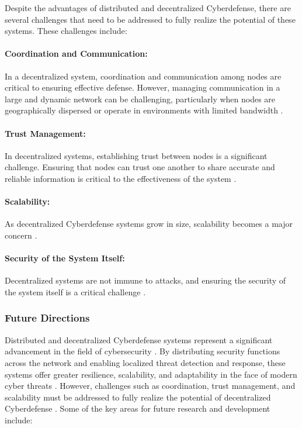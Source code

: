 Despite the advantages of distributed and decentralized Cyberdefense, there are several challenges that need to be addressed to fully realize the potential of these systems. These challenges include:

\paragraph{Coordination and Communication:}
In a decentralized system, coordination and communication among nodes are critical to ensuring effective defense. However, managing communication in a large and dynamic network can be challenging, particularly when nodes are geographically dispersed or operate in environments with limited bandwidth \cite{Xu2017}.

\paragraph{Trust Management:}
In decentralized systems, establishing trust between nodes is a significant challenge. Ensuring that nodes can trust one another to share accurate and reliable information is critical to the effectiveness of the system \cite{Yan2014}.

\paragraph{Scalability:}
As decentralized Cyberdefense systems grow in size, scalability becomes a major concern \cite{Bera2017}.

\paragraph{Security of the System Itself:}
Decentralized systems are not immune to attacks, and ensuring the security of the system itself is a critical challenge \cite{Roman2013}.

\subsubsection{Future Directions}

Distributed and decentralized Cyberdefense systems represent a significant advancement in the field of cybersecurity \cite{Christidis2016}. By distributing security functions across the network and enabling localized threat detection and response, these systems offer greater resilience, scalability, and adaptability in the face of modern cyber threats \cite{Roman2013}. However, challenges such as coordination, trust management, and scalability must be addressed to fully realize the potential of decentralized Cyberdefense \cite{Xu2019}.
Some of the key areas for future research and development include:

